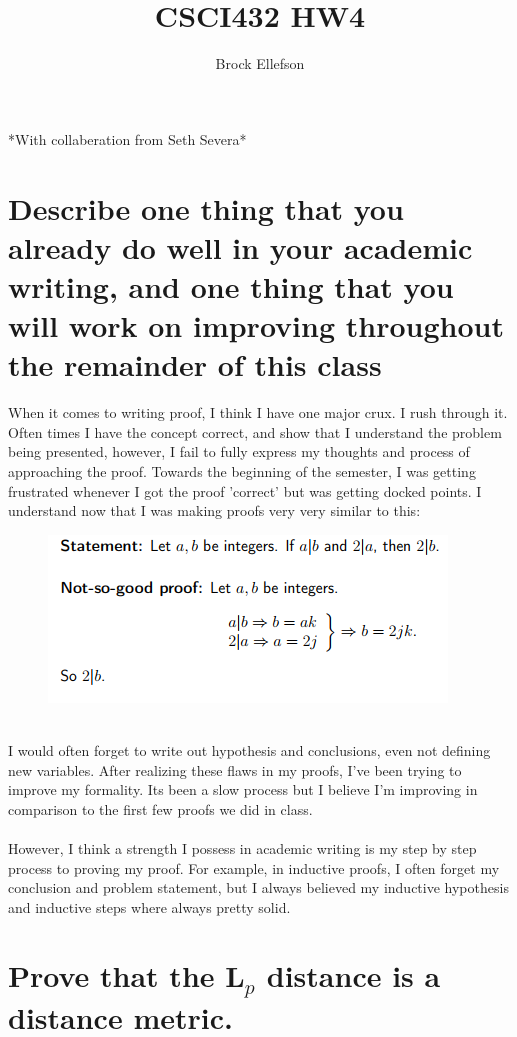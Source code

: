\documentclass[10pt,letterpaper]{article}
\author{Brock Ellefson}
\title{CSCI432 HW4}
\begin{document}
\maketitle
*With collaberation from Seth Severa*\\
\section{Describe one thing
that you already do well in your academic writing,
and one thing that you will work on improving
throughout the remainder of this class}

When it comes to writing proof, I think I have one major crux. I rush through it. Often times I have the concept correct, and show that I understand the problem being presented, however, I fail to fully express my thoughts and process of approaching the proof. Towards the beginning of the semester, I was getting frustrated whenever I got the proof 'correct' but was getting docked points. I understand now that I was making proofs very very similar to this:
\\
	\begin{figure}[h]
		\includegraphics[scale = .75]{badproof.png}
	\end{figure}
\\
I would often forget to write out hypothesis and conclusions, even not defining new variables. After realizing these flaws in my proofs, I've been trying to improve my  formality. Its been a slow process but I believe I'm improving in comparison to the first few proofs we did in class.\\
\\
However, I think a strength I possess in academic writing is my step by step process to proving my proof. For example, in inductive proofs, I often forget my conclusion and problem statement, but I always believed my inductive hypothesis and inductive steps where always pretty solid.

\section{ Prove that the L$_{p}$ distance is a distance metric.}
\end{document}

